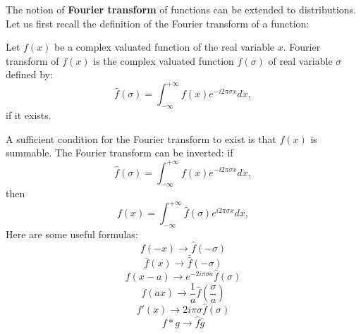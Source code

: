 \documentclass[12pt]{book}
\begin{document}
The notion of {\bf Fourier transform} of functions can be extended to
distributions. Let us first recall the definition of the Fourier
transform of a function:
\begin{defn}
Let $f(x)$ be a complex valuated function of
the real variable 
$x$. Fourier transform of $f(x)$ is the complex valuated function $\hat
f(\sigma)$ of real variable $\sigma$ defined by:
\begin{equation}
\hat f(\sigma)=\int_{-\infty}^{+\infty}f(x)e^{-i2\pi \sigma x}dx,
\end{equation}
if it exists.
\end{defn}
A sufficient condition for the Fourier transform to exist is that $f(x)$ is
summable. The Fourier transform can be inverted: if
\begin{equation}
\hat f(\sigma)=\int_{-\infty}^{+\infty}f(x)e^{-i2\pi \sigma x}dx,
\end{equation}
then
\begin{equation}
f(x)=\int_{-\infty}^{+\infty}\hat f(\sigma)e^{i2\pi \sigma x}dx,
\end{equation}
Here are some useful formulas:
\begin{equation}
f(-x)\rightarrow \hat f(-\sigma)
\end{equation}
\begin{equation}
\bar f(x)\rightarrow \bar{\hat f}(-\sigma)
\end{equation}
\begin{equation}
f(x-a)\rightarrow e^{-2i\pi\sigma a}\hat{f}(\sigma)
\end{equation}
\begin{equation}
f(ax)\rightarrow \frac{1}{a}\hat f(\frac{\sigma}{a})
\end{equation}
\begin{equation}
f'(x)\rightarrow 2i\pi \sigma \hat f(\sigma)
\end{equation}
\begin{equation}
f \ast g \rightarrow \hat f \hat g
\end{equation}
\end{document}

